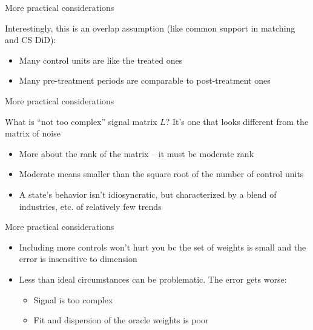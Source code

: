 \documentclass{beamer}
\begin{document}
\begin{frame}{More practical considerations}

Interestingly, this is an overlap assumption (like common support in matching and CS DiD):
	\begin{itemize}
	\item Many control units are like the treated ones
	\item Many pre-treatment periods are comparable to post-treatment ones
	\end{itemize}

\end{frame}


\begin{frame}{More practical considerations}

What is ``not too complex'' signal matrix $L$? It's one that looks different from the matrix of noise

\begin{itemize}
	\item More about the rank of the matrix -- it must be moderate rank
	\item Moderate means smaller than the square root of the number of control units
	\item A state's behavior isn't idiosyncratic, but characterized by a blend of industries, etc. of relatively few trends
\end{itemize}

\end{frame}


\begin{frame}{More practical considerations}

\begin{itemize}
\item Including more controls won't hurt you bc the set of weights is small and the error is insensitive to dimension
\item Less than ideal circumstances can be problematic. The error gets worse:
	\begin{itemize}
	\item Signal is too complex
	\item Fit and dispersion of the oracle weights is poor
	\end{itemize}
\end{itemize}

\end{frame}
\end{document}
